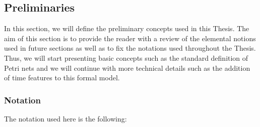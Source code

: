 \subsection*{Preliminaries}
In this section, we will define the preliminary concepts
used in this Thesis. The aim of this section is to provide the reader
with a review of the elemental notions used in future sections
as well as to fix the notations used throughout the Thesis.
Thus, we will start presenting basic concepts such as the standard definition of Petri
nets and we will continue with more technical details such as the addition of time features
to this formal model.


\subsubsection{Notation}
The notation used here is the following:

